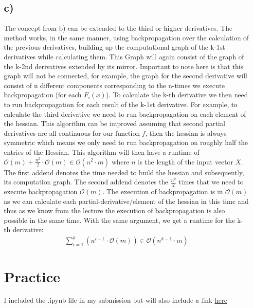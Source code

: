 \documentclass[a4paper,12pt]{ETHexercise}
\begin{document}
\subsection*{c)}
The concept from b) can be extended to the third or higher derivatives. The method works, in the same manner, using backpropagation over the calculation of the previous derivatives, building up the computational graph of the k-1st derivatives while calculating them. This Graph will again consist of the graph of the k-2nd derivatives extended by its mirror. Important to note here is that this graph will not be connected, for example, the graph for the second derivative will consist of n different components corresponding to the n-times we execute backpropagation (for each $F_i(x)$). To calculate the k-th derivative we then need to run backpropagation for each result of the k-1st derivative. For example, to calculate the third derivative we need to run backpropagation on each element of the hessian. This algorithm can be improved assuming that second partial derivatives are all continuous for our function $f$, then the hessian is always symmetric which means we only need to run backpropagation on roughly half the entries of the Hessian. This algorithm will then have a runtime of $\mathcal{O}(m)+ \frac{n^2}{2} \cdot \mathcal{O}(m) \in  \mathcal{O}(n^2 \cdot m)$ where $n$ is the length of the input vector $X$. The first addend denotes the time needed to build the hessian and subsequently, its computation graph. The second addend denotes the $\frac{n^2}{2}$ times that we need to execute backpropagation $\mathcal{O}(m)$. The execution of backpropagation is in $\mathcal{O}(m)$ as we can calculate each partial-derivative/element of the hessian in this time and thus as we know from the lecture the execution of backpropagation is also possible in the same time.
With the same argument, we get a runtime for the k-th derivative:
\begin{align}
   \sum_{i = 1}^{k}(n^{i-1}\cdot \mathcal{O}(m)) \in \mathcal{O}(n^{k-1} \cdot m)
\end{align}
\section{Practice}
I included the .ipynb file in my submission but will also include a link \href{https://colab.research.google.com/drive/1qNx3ZJzbVwTNZax_ccs3adHzyw6r8WlD?usp=sharing}{here}
\end{document}
